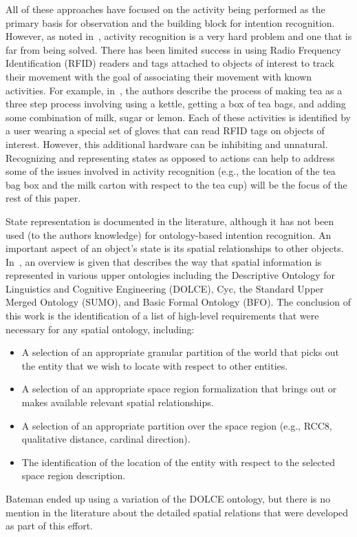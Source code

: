 \documentclass[preprint,12pt]{elsarticle}
\begin{document}
All of these approaches have focused on the activity being performed as the primary basis for observation and the building block for intention recognition. However, as noted in~\cite{SADRI.2011}, activity recognition is a very hard problem and one that is far from being solved. There has been limited success in using Radio Frequency Identification (RFID) readers and tags attached to objects of interest to track their movement with the goal of associating their movement with known activities. For example, in~\cite{Philipose.PC.2004}, the authors describe the process of making tea as a three step process involving using a kettle, getting a box of tea bags, and adding some combination of milk, sugar or lemon. Each of these activities is identified by a user wearing a special set of gloves that can read RFID tags on objects of interest. However, this additional hardware can be inhibiting and unnatural.  Recognizing and representing states as opposed to actions can help to address some of the issues involved in activity recognition (e.g., the location of the tea bag box and the milk carton with respect to the tea cup) will be the focus of the rest of this paper.


State representation is documented in the literature, although it has not been used (to the authors knowledge) for ontology-based intention recognition. An important aspect of an object's state is its spatial relationships to other objects. In~\cite{Bateman.2006}, an overview is given that describes the way that spatial information is represented in various upper ontologies including the Descriptive Ontology for Linguistics and Cognitive Engineering (DOLCE), Cyc, the Standard Upper Merged Ontology (SUMO), and Basic Formal Ontology (BFO). The conclusion of this work is the identification of a list of high-level requirements that were necessary for any spatial ontology, including:

\begin{itemize}
\item A selection of an appropriate granular partition of the world that picks out the entity that we wish to locate with respect to other entities.
\item A selection of an appropriate space region formalization that brings out or makes available relevant spatial relationships.
\item A selection of an appropriate partition over the space region (e.g., RCC8, qualitative distance, cardinal direction).
\item The identification of the location of the entity with respect to the selected space region description.
\end{itemize}
Bateman ended up using a variation of the DOLCE ontology, but there is no mention in the literature about the detailed spatial relations that were developed as part of this effort.
\end{document}
